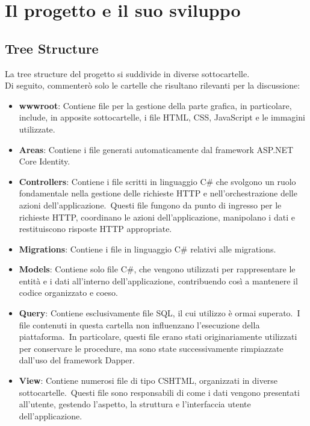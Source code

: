 \chapter{Il progetto e il suo sviluppo}\label{chapter:formattazione}
%
\section{Tree Structure}\label{sec:cap_sec_subsec}

La tree structure del progetto si suddivide in diverse sottocartelle.\\ 
Di seguito, commenterò solo le cartelle che risultano rilevanti per la discussione:
\begin{itemize}
	\item \textbf{wwwroot}: Contiene file per la gestione della parte grafica, 
	in particolare, include, in apposite sottocartelle, i file HTML, CSS, JavaScript e le immagini utilizzate. 
	\item \textbf{Areas}: Contiene i file generati automaticamente dal framework ASP.NET Core Identity.
	\item \textbf{Controllers}: Contiene i file scritti in linguaggio C\# che svolgono un 
	ruolo fondamentale nella gestione delle richieste HTTP e nell'orchestrazione 
	delle azioni dell'applicazione.\ Questi file fungono da punto di ingresso per 
	le richieste HTTP, coordinano le azioni dell'applicazione, manipolano i dati e 
	restituiscono risposte HTTP appropriate.
	\item \textbf{Migrations}: Contiene i file in linguaggio C\# relativi alle migrations.
	\item \textbf{Models}: Contiene solo file C\#, che vengono utilizzati per rappresentare 
	le entità e i dati all'interno dell'applicazione, contribuendo così a mantenere il 
	codice organizzato e coeso.
	\item \textbf{Query}: Contiene esclusivamente file SQL, il cui utilizzo è ormai superato.\ 
	I file contenuti in questa cartella non influenzano l'esecuzione della piattaforma.\
	In particolare, questi file erano stati originariamente utilizzati per conservare le procedure, 
	ma sono state successivamente rimpiazzate dall'uso del framework Dapper. 
	\item \textbf{View}: Contiene numerosi file di tipo CSHTML, organizzati in diverse 
	sottocartelle.\ Questi file sono responsabili di come i dati vengono presentati 
	all'utente, gestendo l'aspetto, la struttura e l'interfaccia utente dell'applicazione.
\end{itemize}
